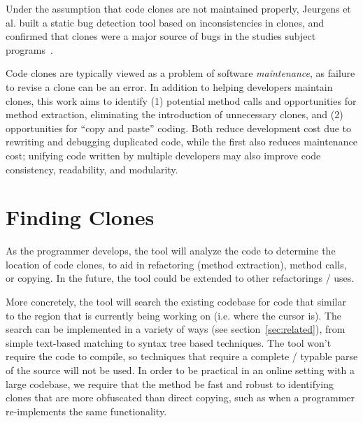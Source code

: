 \documentclass[preprint,10pt]{sigplanconf}
\begin{document}
Under the assumption that code clones are not maintained properly,
Jeurgens et al. built a static bug detection tool based on
inconsistencies in clones, and confirmed that clones were a major
source of bugs in the studies subject programs~\cite{Juergens2009}.


Code clones are typically viewed as a problem of software
\emph{maintenance}, as failure to revise a clone can be an error. In
addition to helping developers maintain clones, this work aims to
identify (1) potential method calls and opportunities for method
extraction, eliminating the introduction of unnecessary clones, and
(2) opportunities for ``copy and paste'' coding. Both reduce development cost 
due to rewriting and debugging duplicated code,
while the first also reduces maintenance cost; unifying code written
by multiple developers may also improve code consistency, readability, 
and modularity.

\section{Finding Clones}


As the programmer develops, the tool will analyze the code to
determine the location of code clones, to aid in refactoring (method
extraction), method calls, or copying. In the future, the tool could
be extended to other refactorings / uses.

More concretely, the tool will search the existing codebase for code
that similar to the region that is currently being working on
(i.e. where the cursor is). The search can be implemented in a variety
of ways (see section~\ref{sec:related}), from simple text-based
matching to syntax tree based techniques. The tool won't require the
code to compile, so techniques that require a complete / typable parse
of the source will not be used. In order to be practical in an online
setting with a large codebase, we require that the method be fast and
robust to identifying clones that are more obfuscated than direct
copying, such as when a programmer re-implements the same
functionality.
\end{document}

